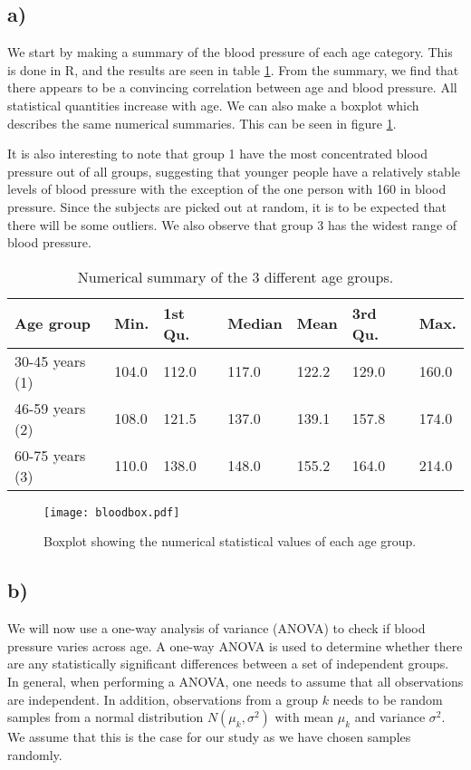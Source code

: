\documentclass[a4paper, 10pt, reqno]{amsart}
\begin{document}
\subsection{a)}
We start by making a summary of the blood pressure of each age category. This is done in R, and the results are seen in table \ref{tab: bloodsum}. From the summary, we find that there appears to be a convincing correlation between age and blood pressure. All statistical quantities increase with age. We can also make a boxplot which describes the same numerical summaries. This can be seen in figure \ref{fig: bloodbox}. 

It is also interesting to note that group 1 have the most concentrated blood pressure out of all groups, suggesting that younger people have a relatively stable levels of blood pressure with the exception of the one person with 160 in blood pressure. Since the subjects are picked out at random, it is to be expected that there will be some outliers. We also observe that group 3 has the widest range of blood pressure.


\begin{table}
\caption{Numerical summary of the 3 different age groups.}
\label{tab: bloodsum}
\begin{tabular}{lllllll}
\hline\hline
Age group   & Min.  & 1st Qu. & Median & Mean  & 3rd Qu. & Max.  \\ \hline
30-45 years (1) & 104.0 & 112.0   & 117.0  & 122.2 & 129.0   & 160.0 \\
46-59 years (2)& 108.0 & 121.5   & 137.0  & 139.1 & 157.8   & 174.0 \\
60-75 years (3)& 110.0 & 138.0   & 148.0  & 155.2 & 164.0   & 214.0 \\ \hline
\end{tabular}
\end{table}

\begin{figure}
    \centering
    \texttt{[image: bloodbox.pdf]}
    \caption{Boxplot showing the numerical statistical values of each age group.}
    \label{fig: bloodbox}
\end{figure}

\subsection{b)}
We will now use a one-way analysis of variance (ANOVA) to check if blood pressure varies across age. A one-way ANOVA is used to determine whether there are any statistically significant differences between a set of independent groups. In general, when performing a ANOVA, one needs to assume that all observations are independent. In addition, observations from a group $k$ needs to be random samples from a normal distribution $N(\mu_k,\sigma^2)$ with mean $\mu_k$ and variance $\sigma^2$. We assume that this is the case for our study as we have chosen samples randomly. 
\end{document}
